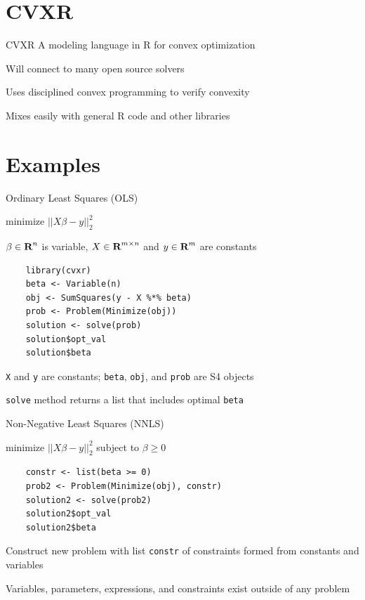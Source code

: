 \documentclass{beamer}
\begin{document}
\section{CVXR}

\begin{frame}{CVXR}
	A modeling language in R for convex optimization
	
	\BIT
		\item Will connect to many open source solvers
		\item Uses disciplined convex programming to 
verify convexity
		\item Mixes easily with general R code and other libraries
	\EIT
\end{frame}

\section{Examples}

\begin{frame}[fragile]{Ordinary Least Squares (OLS)}
	\BIT
		\item minimize $||X\beta - y||_2^2$
		\item $\beta \in {\mbox{\bf R}}^n$ is variable, $X \in {\mbox{\bf R}}^{m \times n}$ and $y \in {\mbox{\bf R}}^m$ are constants
	\EIT
	
	\pause
	\begin{verbatim}
	library(cvxr)
	beta <- Variable(n)
	obj <- SumSquares(y - X %*% beta)
	prob <- Problem(Minimize(obj))
	solution <- solve(prob)
	solution$opt_val
	solution$beta
	\end{verbatim}
	
	\BIT
		\item \verb|X| and \verb|y| are constants; \verb|beta|, \verb|obj|, and \verb|prob| are S4 objects
		\item \verb|solve| method returns a list that includes optimal \verb|beta|
	\EIT
\end{frame}

\begin{frame}[fragile]{Non-Negative Least Squares (NNLS)}
	\BIT
	\item minimize $||X\beta - y||_2^2$ subject to $\beta \geq 0$
	\EIT
	\pause
	\begin{verbatim}
	constr <- list(beta >= 0)
	prob2 <- Problem(Minimize(obj), constr)
	solution2 <- solve(prob2)
	solution2$opt_val
	solution2$beta
	\end{verbatim}
	
	\BIT
		\item Construct new problem with list \verb|constr| of constraints formed from constants and variables
		\item Variables, parameters, expressions, and constraints exist outside of any problem
	\EIT
\end{frame}
\end{document}
